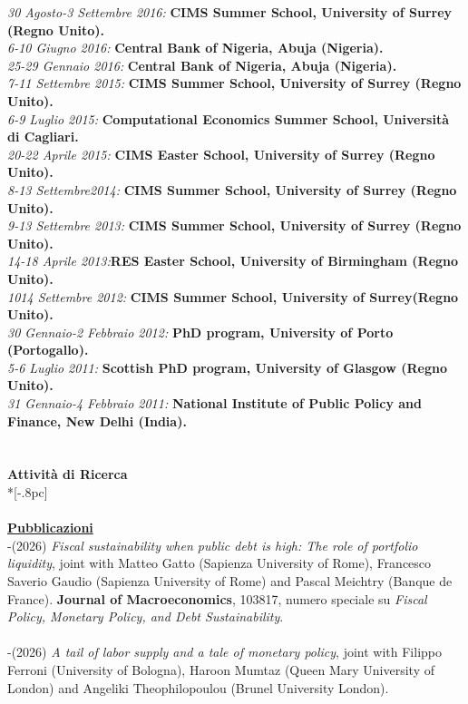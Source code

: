 \documentclass[10p]{article}
\begin{document}
\emph{30 Agosto-3 Settembre 2016:} {\bf CIMS Summer School, University of Surrey (Regno Unito).}\\
\emph{6-10 Giugno 2016:} {\bf Central Bank of Nigeria, Abuja (Nigeria).}\\
\emph{25-29 Gennaio 2016:} {\bf Central Bank of Nigeria, Abuja (Nigeria).}\\
\emph{7-11 Settembre 2015:} {\bf CIMS Summer School, University of Surrey (Regno Unito).}\\
\emph{6-9 Luglio 2015:} {\bf Computational Economics Summer School, Universit\`{a} di Cagliari.}\\
\emph{20-22 Aprile 2015:} {\bf CIMS Easter School, University of Surrey (Regno Unito).}\\
\emph{8-13 Settembre2014:} {\bf CIMS Summer School, University of Surrey (Regno Unito).}\\
\emph{9-13 Settembre 2013:} {\bf CIMS Summer School, University of Surrey (Regno Unito).}\\
\emph{14-18 Aprile 2013:}{\bf RES Easter School, University of Birmingham (Regno Unito).}\\
\emph{1014 Settembre 2012:} {\bf CIMS Summer School, University of Surrey(Regno Unito).}\\
\emph{30 Gennaio-2 Febbraio 2012:} {\bf PhD program, University of Porto (Portogallo).}\\
\emph{5-6 Luglio 2011:} {\bf Scottish PhD program, University of Glasgow (Regno Unito).}\\
\emph{31 Gennaio-4 Febbraio 2011:} {\bf National Institute of Public Policy and Finance, New Delhi (India).}\\
\\
\\
{\large \bf Attivit\`{a} di Ricerca} \\*[-.8pc]
\underline{\hspace{6in}} \\
\\
{\bf \underline{Pubblicazioni}}\\
-(2026) \emph{Fiscal sustainability when public debt is high: The role of portfolio liquidity}, joint with Matteo Gatto (Sapienza University of Rome), Francesco Saverio Gaudio (Sapienza University of Rome) and Pascal Meichtry (Banque de France).
\textbf{Journal of Macroeconomics}, 103817, numero speciale su \emph{Fiscal Policy, Monetary Policy, and Debt Sustainability}.\\
\\
-(2026) \emph{A tail of labor supply and a tale of monetary policy}, joint with Filippo Ferroni (University of Bologna), Haroon Mumtaz (Queen Mary University of London) and Angeliki Theophilopoulou (Brunel University London).
\end{document}
